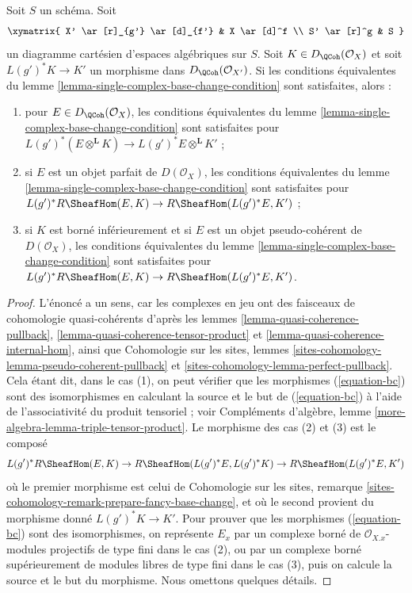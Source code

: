 \begin{lemma}
\label{lemma-single-complex-base-change-condition-inherited}
Soit $S$ un schéma. Soit
$$
\xymatrix{
X' \ar[r]_{g'} \ar[d]_{f'} &
X \ar[d]^f \\
S' \ar[r]^g &
S
}
$$
un diagramme cartésien d'espaces algébriques sur $S$.
Soit $K \in D_\QCoh(\mathcal{O}_X)$ et soit $L(g')^*K \to K'$
un morphisme dans $D_\QCoh(\mathcal{O}_{X'})$. Si les conditions équivalentes du
lemme \ref{lemma-single-complex-base-change-condition} sont satisfaites, alors :
\begin{enumerate}
\item pour $E \in D_\QCoh(\mathcal{O}_X)$, les conditions
équivalentes du lemme \ref{lemma-single-complex-base-change-condition} sont satisfaites
pour $L(g')^*(E \otimes^\mathbf{L} K) \to L(g')^*E \otimes^\mathbf{L} K'$ ;
\item si $E$ est un objet parfait de $D(\mathcal{O}_X)$, les conditions équivalentes du
lemme \ref{lemma-single-complex-base-change-condition} sont satisfaites pour
$L(g')^*R\SheafHom(E, K) \to R\SheafHom(L(g')^*E, K')$ ;
\item si $K$ est borné inférieurement et si $E$ est un objet pseudo-cohérent de
$D(\mathcal{O}_X)$, les conditions équivalentes du
lemme \ref{lemma-single-complex-base-change-condition} sont satisfaites pour
$L(g')^*R\SheafHom(E, K) \to R\SheafHom(L(g')^*E, K')$.
\end{enumerate}
\end{lemma}

\begin{proof}
L'énoncé a un sens, car les complexes en jeu ont des faisceaux de cohomologie
quasi-cohérents d'après les lemmes
\ref{lemma-quasi-coherence-pullback},
\ref{lemma-quasi-coherence-tensor-product} et
\ref{lemma-quasi-coherence-internal-hom}, ainsi que
Cohomologie sur les sites, lemmes
\ref{sites-cohomology-lemma-pseudo-coherent-pullback} et
\ref{sites-cohomology-lemma-perfect-pullback}.
Cela étant dit, dans le cas (1), on peut vérifier que les morphismes (\ref{equation-bc})
sont des isomorphismes en calculant la source et le but
de (\ref{equation-bc}) à l'aide de l'associativité du produit tensoriel ; voir
Compléments d'algèbre, lemme \ref{more-algebra-lemma-triple-tensor-product}.
Le morphisme des cas (2) et (3) est le composé
$$
L(g')^*R\SheafHom(E, K) \to R\SheafHom(L(g')^*E, L(g')^*K)
\to R\SheafHom(L(g')^*E, K')
$$
où le premier morphisme est celui de
Cohomologie sur les sites, remarque
\ref{sites-cohomology-remark-prepare-fancy-base-change},
et où le second provient du morphisme donné $L(g')^*K \to K'$.
Pour prouver que les morphismes (\ref{equation-bc}) sont des isomorphismes, on représente
$E_x$ par un complexe borné de $\mathcal{O}_{X. x}$-modules projectifs de type fini
dans le cas (2), ou par un complexe borné supérieurement de modules libres de type fini dans le cas (3),
puis on calcule la source et le but du morphisme.
Nous omettons quelques détails.
\end{proof}

